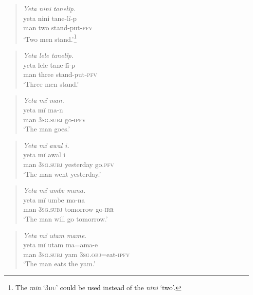 \begin{quote}\textit{Yeta nini tanelïp.}\\
\gll    yeta  nini  tane-lï-p\\
    man  two  stand-put-\textsc{pfv}\\
\glt    ‘Two men stand.’\footnote{The   \textit{min} ‘\textsc{3du}’ could be used instead of the  \textit{nini} ‘two’.}\end{quote}

\begin{quote}\textit{Yeta lele tanelïp.}\\
\gll    yeta  lele    tane-lï-p\\
    man  three  stand-put-\textsc{pfv}\\
\glt    ‘Three men stand.’\end{quote}

\newpage

\begin{quote}\textit{Yeta mï man.}\\
\gll    yeta  mï      ma-n\\
    man  3\textsc{sg.subj}  go-\textsc{ipfv}\\
\glt    ‘The man goes.’\end{quote}

\begin{quote}\textit{Yeta mï awal i.}\\
\gll    yeta  mï      awal    i\\
    man  \textsc{3sg.subj}  yesterday  go.\textsc{pfv}\\
\glt    ‘The man went yesterday.’\end{quote}

\begin{quote}\textit{Yeta mï umbe mana.}\\
\gll    yeta  mï      umbe    ma-na\\
    man  \textsc{3sg.subj}  tomorrow  go-\textsc{irr}\\
\glt    ‘The man will go tomorrow.’\end{quote}

\begin{quote}\textit{Yeta mï utam mame.}\\
\gll    yeta  mï      utam  ma=ama-e\\
    man  \textsc{3sg.subj}  yam  3\textsc{sg.obj}=eat-\textsc{ipfv}\\
\glt    ‘The man eats the yam.’\end{quote}

